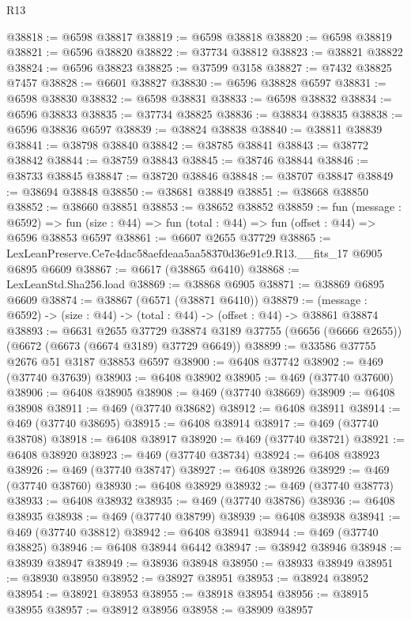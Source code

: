 \begin{lexlean}{R13}
\begin{coremodule}
@38818 := @6598 @38817
@38819 := @6598 @38818
@38820 := @6598 @38819
@38821 := @6596 @38820
@38822 := @37734 @38812
@38823 := @38821 @38822
@38824 := @6596 @38823
@38825 := @37599 @3158
@38827 := @7432 @38825 @7457
@38828 := @6601 @38827
@38830 := @6596 @38828 @6597
@38831 := @6598 @38830
@38832 := @6598 @38831
@38833 := @6598 @38832
@38834 := @6596 @38833
@38835 := @37734 @38825
@38836 := @38834 @38835
@38838 := @6596 @38836 @6597
@38839 := @38824 @38838
@38840 := @38811 @38839
@38841 := @38798 @38840
@38842 := @38785 @38841
@38843 := @38772 @38842
@38844 := @38759 @38843
@38845 := @38746 @38844
@38846 := @38733 @38845
@38847 := @38720 @38846
@38848 := @38707 @38847
@38849 := @38694 @38848
@38850 := @38681 @38849
@38851 := @38668 @38850
@38852 := @38660 @38851
@38853 := @38652 @38852
@38859 := fun (message : @6592) =>
  fun (size : @44) => fun (total : @44) => fun (offset : @44) => @6596 @38853 @6597
@38861 := @6607 @2655 @37729
@38865 := LexLeanPreserve.Ce7e4dac58aefdeaa5aa58370d36e91c9.R13.__fits_17 @6905 @6895 @6609
@38867 := @6617 (@38865 @6410)
@38868 := LexLeanStd.Sha256.load
@38869 := @38868 @6905
@38871 := @38869 @6895 @6609
@38874 := @38867 (@6571 (@38871 @6410))
@38879 := (message : @6592) -> (size : @44) -> (total : @44) -> (offset : @44) -> @38861 @38874
@38893 := @6631
    @2655
    @37729
    @38874
    @3189
    @37755
    (@6656 (@6666 @2655))
    (@6672 (@6673 (@6674 @3189) @37729 @6649))
@38899 := @33586 @37755 @2676 @51 @3187 @38853 @6597
@38900 := @6408 @37742
@38902 := @469 (@37740 @37639)
@38903 := @6408 @38902
@38905 := @469 (@37740 @37600)
@38906 := @6408 @38905
@38908 := @469 (@37740 @38669)
@38909 := @6408 @38908
@38911 := @469 (@37740 @38682)
@38912 := @6408 @38911
@38914 := @469 (@37740 @38695)
@38915 := @6408 @38914
@38917 := @469 (@37740 @38708)
@38918 := @6408 @38917
@38920 := @469 (@37740 @38721)
@38921 := @6408 @38920
@38923 := @469 (@37740 @38734)
@38924 := @6408 @38923
@38926 := @469 (@37740 @38747)
@38927 := @6408 @38926
@38929 := @469 (@37740 @38760)
@38930 := @6408 @38929
@38932 := @469 (@37740 @38773)
@38933 := @6408 @38932
@38935 := @469 (@37740 @38786)
@38936 := @6408 @38935
@38938 := @469 (@37740 @38799)
@38939 := @6408 @38938
@38941 := @469 (@37740 @38812)
@38942 := @6408 @38941
@38944 := @469 (@37740 @38825)
@38946 := @6408 @38944 @6442
@38947 := @38942 @38946
@38948 := @38939 @38947
@38949 := @38936 @38948
@38950 := @38933 @38949
@38951 := @38930 @38950
@38952 := @38927 @38951
@38953 := @38924 @38952
@38954 := @38921 @38953
@38955 := @38918 @38954
@38956 := @38915 @38955
@38957 := @38912 @38956
@38958 := @38909 @38957

\end{coremodule}
\end{lexlean}
